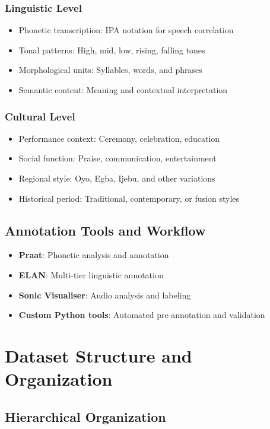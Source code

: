 \documentclass[12pt]{article}
\begin{document}
\subsubsection{Linguistic Level}
\begin{itemize}
    \item Phonetic transcription: IPA notation for speech correlation
    \item Tonal patterns: High, mid, low, rising, falling tones
    \item Morphological units: Syllables, words, and phrases
    \item Semantic content: Meaning and contextual interpretation
\end{itemize}

\subsubsection{Cultural Level}
\begin{itemize}
    \item Performance context: Ceremony, celebration, education
    \item Social function: Praise, communication, entertainment
    \item Regional style: Oyo, Egba, Ijebu, and other variations
    \item Historical period: Traditional, contemporary, or fusion styles
\end{itemize}

\subsection{Annotation Tools and Workflow}

\begin{itemize}
    \item \textbf{Praat}: Phonetic analysis and annotation
    \item \textbf{ELAN}: Multi-tier linguistic annotation
    \item \textbf{Sonic Visualiser}: Audio analysis and labeling
    \item \textbf{Custom Python tools}: Automated pre-annotation and validation
\end{itemize}

\section{Dataset Structure and Organization}

\subsection{Hierarchical Organization}
\end{document}
